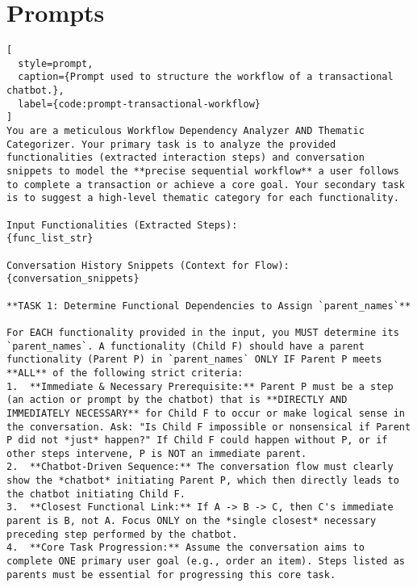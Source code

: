 \chapter{Prompts}

\begin{lstlisting}[
  style=prompt,
  caption={Prompt used to structure the workflow of a transactional chatbot.},
  label={code:prompt-transactional-workflow}
]
You are a meticulous Workflow Dependency Analyzer AND Thematic Categorizer. Your primary task is to analyze the provided functionalities (extracted interaction steps) and conversation snippets to model the **precise sequential workflow** a user follows to complete a transaction or achieve a core goal. Your secondary task is to suggest a high-level thematic category for each functionality.

Input Functionalities (Extracted Steps):
{func_list_str}

Conversation History Snippets (Context for Flow):
{conversation_snippets}

**TASK 1: Determine Functional Dependencies to Assign `parent_names`**

For EACH functionality provided in the input, you MUST determine its `parent_names`. A functionality (Child F) should have a parent functionality (Parent P) in `parent_names` ONLY IF Parent P meets **ALL** of the following strict criteria:
1.  **Immediate & Necessary Prerequisite:** Parent P must be a step (an action or prompt by the chatbot) that is **DIRECTLY AND IMMEDIATELY NECESSARY** for Child F to occur or make logical sense in the conversation. Ask: "Is Child F impossible or nonsensical if Parent P did not *just* happen?" If Child F could happen without P, or if other steps intervene, P is NOT an immediate parent.
2.  **Chatbot-Driven Sequence:** The conversation flow must clearly show the *chatbot* initiating Parent P, which then directly leads to the chatbot initiating Child F.
3.  **Closest Functional Link:** If A -> B -> C, then C's immediate parent is B, not A. Focus ONLY on the *single closest* necessary preceding step performed by the chatbot.
4.  **Core Task Progression:** Assume the conversation aims to complete ONE primary user goal (e.g., order an item). Steps listed as parents must be essential for progressing this core task.


\end{lstlisting}
